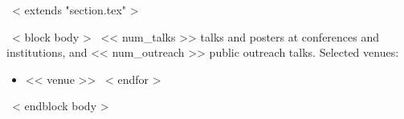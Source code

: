 ~< extends "section.tex" >~

~< block body >~
<< num_talks >> talks and posters at conferences and institutions, and << num_outreach >> public outreach talks.
Selected venues:
\begin{itemize}
  \setlength{\itemsep}{0pt}
  \setlength{\parskip}{0pt}
  ~< for venue in selected_venues >~
  \item << venue >>
  ~< endfor >~
\end{itemize}
~< endblock body >~
